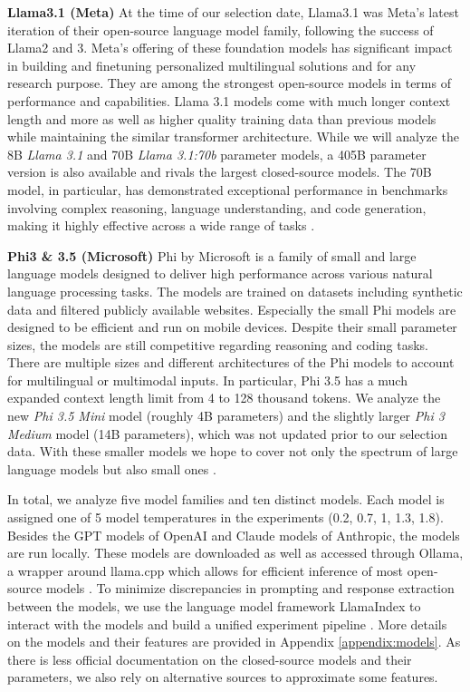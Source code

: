 \par \textbf{Llama3.1 (Meta)} At the time of our selection date, Llama3.1 was Meta's latest iteration of their open-source language model family, following the success of Llama2 and 3. Meta's offering of these foundation models has significant impact in building and finetuning personalized multilingual solutions and for any research purpose. They are among the strongest open-source models in terms of performance and capabilities. Llama 3.1 models come with much longer context length and more as well as higher quality training data than previous models while maintaining the similar transformer architecture. While we will analyze the 8B \textit{Llama 3.1} and 70B \textit{Llama 3.1:70b} parameter models, a 405B parameter version is also available and rivals the largest closed-source models. The 70B model, in particular, has demonstrated exceptional performance in benchmarks involving complex reasoning, language understanding, and code generation, making it highly effective across a wide range of tasks \parencite{dubey2024llama,meta2024llama31}.

\par \textbf{Phi3 \& 3.5 (Microsoft)} Phi by Microsoft is a family of small and large language models designed to deliver high performance across various natural language processing tasks. The models are trained on datasets including synthetic data and filtered publicly available websites. Especially the small Phi models are designed to be efficient and run on mobile devices. Despite their small parameter sizes, the models are still competitive regarding reasoning and coding tasks. There are multiple sizes and different architectures of the Phi models to account for multilingual or multimodal inputs. In particular, Phi 3.5 has a much expanded context length limit from 4 to 128 thousand tokens. We analyze the new \textit{Phi 3.5 Mini} model (roughly 4B parameters) and the slightly larger \textit{Phi 3 Medium} model (14B parameters), which was not updated prior to our selection data. With these smaller models we hope to cover not only the spectrum of large language models but also small ones \parencite{abdin2024phi}.

\setlength{\parindent}{0pt}
\par In total, we analyze five model families and ten distinct models. Each model is assigned one of 5 model temperatures in the experiments (0.2, 0.7, 1, 1.3, 1.8). Besides the GPT models of OpenAI and Claude models of Anthropic, the models are run locally. These models are downloaded as well as accessed through Ollama, a wrapper around llama.cpp which allows for efficient inference of most open-source models \parencite{gerganov2023llamacpp}. To minimize discrepancies in prompting and response extraction between the models, we use the language model framework LlamaIndex to interact with the models and build a unified experiment pipeline \parencite{liullamaindex2022}. More details on the models and their features are provided in Appendix \ref{appendix:models}. As there is less official documentation on the closed-source models and their parameters, we also rely on alternative sources to approximate some features.


